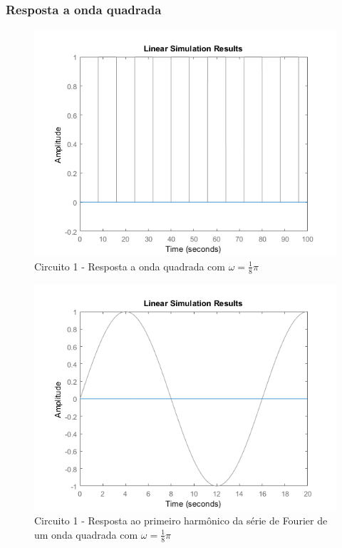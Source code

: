 \documentclass[a4paper, 12pt]{article}
\begin{document}
			\subsubsection{Resposta a onda quadrada}
			\begin{figure}[!ht]
				\centering
				\includegraphics[scale=0.71]{img/1i_circ1.png}
				\caption{Circuito 1 - Resposta a onda quadrada com $\omega = \frac{1}{8}\pi$}	
			\end{figure}			
			\begin{figure}[!ht]
				\centering
				\includegraphics[scale=0.71]{img/1j_circ1.png}
				\caption{Circuito 1 - Resposta ao primeiro harmônico da série de Fourier de um onda quadrada com $\omega = \frac{1}{8}\pi$}	
			\end{figure}		
\end{document}
